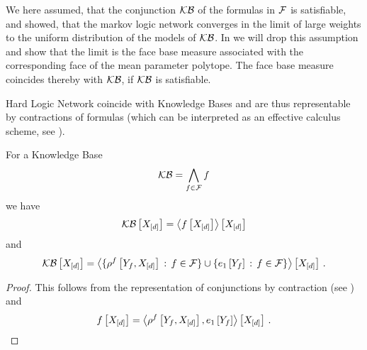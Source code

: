 We here assumed, that the conjunction $\mathcal{KB}$ of the formulas in $\mathcal{F}$ is satisfiable, and showed, that the markov logic network converges in the limit of large weights to the uniform distribution of the models of $\mathcal{KB}$.
In  we will drop this assumption and show that the limit is the face base measure associated with the corresponding face of the mean parameter polytope.
The face base measure coincides thereby with $\mathcal{KB}$, if $\mathcal{KB}$ is satisfiable.




Hard Logic Network coincide with Knowledge Bases and are thus representable by contractions of formulas (which can be interpreted as an effective calculus scheme, see ).


\begin{theorem}\label{the:conDecKB}
	For a Knowledge Base
		\[ \mathcal{KB} = \bigwedge_{f\in\mathcal{F}} f \]
	we have
		\[ \mathcal{KB}\left[X_{[d]}\right] = \left\langle f\left[X_{[d]}\right]\right\rangle \left[ X_{[d]} \right]   \]
	and
		\[ \mathcal{KB}\left[X_{[d]}\right] = \left\langle \{\rho^{f}\left[Y_{f},X_{[d]}\right] \, : \, f\in\mathcal{F}\} \cup \{e_1\left[Y_{f}\right] \, : \, f\in\mathcal{F}\} \right\rangle \left[ X_{[d]} \right] \, .  \]
\end{theorem}
\begin{proof}
	This follows from the representation of conjunctions by contraction (see ) and
		\[ f\left[X_{[d]}\right] =  \left\langle \rho^{f}\left[Y_{f},X_{[d]}\right],e_1\left[Y_{f}\right]\right\rangle \left[ X_{[d]} \right] \, .\]
\end{proof}

